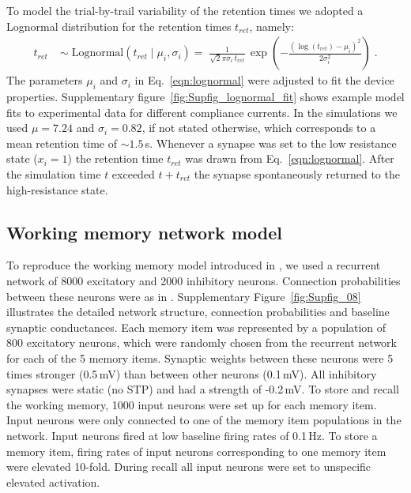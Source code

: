 To model the trial-by-trail variability of the retention times we adopted a Lognormal distribution for the retention times $t_{ret}$, namely:
\begin{equation}
  \begin{split}
    t_{ret} \; &\sim\; \mathrm{Lognormal}( t_{ret} \;|\; \mu_i, \sigma_i )
    =\; \frac{1}{\sqrt{2}\pi\sigma_i \, t_{ret}} \, \exp \left( -\frac{(\log(t_{ret}) - \mu_i)^2}{2\sigma_i^2} \right) \;.
  \end{split}
  \label{eqn:lognormal}
\end{equation}
The parameters $\mu_i$ and $\sigma_i$ in Eq.~\ref{eqn:lognormal} were adjusted to fit the device properties. Supplementary figure~\ref{fig:Supfig_lognormal_fit} shows example model fits to experimental data for different compliance currents. In the simulations we used $\mu =  7.24$ and $\sigma_i = 0.82$, if not stated otherwise, which corresponds to a mean retention time of $\sim1.5$\,s. Whenever a synapse was set to the low resistance state ($x_i=1$) the retention time $t_{ret}$ was  drawn from Eq.~\ref{eqn:lognormal}. After the simulation time $t$ exceeded $t+t_{ret}$ the synapse spontaneously returned to the high-resistance state.

\subsection{Working memory network model}
\label{sec:network}

To reproduce the working memory model introduced in \cite{mongillo2008synaptic}, we used a recurrent network of 8000 excitatory and 2000 inhibitory neurons. Connection probabilities between these neurons were as in \cite{mongillo2008synaptic}. Supplementary Figure~\ref{fig:Supfig_08} illustrates the detailed network structure, connection probabilities and baseline synaptic conductances. Each memory item was represented by a population of 800 excitatory neurons, which were randomly chosen from the recurrent network for each of the 5 memory items. Synaptic weights between these neurons were 5 times stronger (0.5\,mV) than between other neurons (0.1\,mV). All inhibitory synapses were static (no STP) and had a strength of -0.2\,mV. To store and recall the working memory, 1000 input neurons were set up for each memory item. Input neurons were only connected to one of the memory item populations in the network. Input neurons fired at low baseline firing rates of 0.1\,Hz. To store a memory item, firing rates of input neurons corresponding to one memory item were elevated 10-fold. During recall all input neurons were set to unspecific elevated activation.

